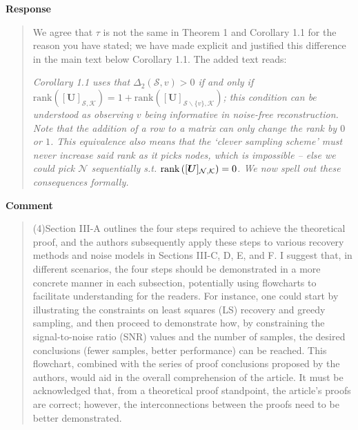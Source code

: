 \documentclass[11pt,onecolumn,journal]{IEEEtran}
\newcommand{\matr}[1]{\bm{#1}}
\theoremstyle{definition}
\newcommand{\set}[1]{\mathcal{#1}}
\newcommand{\rank}[1]{\textrm{rank}\left(#1\right)}
\newcommand{\matrsubU}[1]{\matrsub[#1, K]{U}}
\newcommand{\matrsubUGen}[1]{[\matr{U}]_{#1, \set{K}}}
\begin{document}
\textbf{Response}
\begin{quote}
We agree that $\tau$ is not the same in Theorem 1 and Corollary 1.1 for the reason you have stated; we have made explicit and justified this difference in the main text below Corollary 1.1. The added text reads:


{\it Corollary 1.1 uses that $\Delta_{2}(\set{S},v) > 0$ if and only if $ \rank{\matrsubUGen{\set{S}}} = 1 + \rank{\matrsubUGen{\set{S} \backslash \{v\}}}$; this condition can be understood as observing $v$ being informative in noise-free reconstruction. Note that the addition of a row to a matrix can only change the rank by $0$ or $1$. This equivalence also means that the `clever sampling scheme' must never increase said rank as it picks nodes, which is impossible -- else we could pick $\set{N}$ sequentially s.t. $\rank{\matrsubU{N}} = 0$. We now spell out these consequences formally.}

\end{quote}

\textbf{Comment}
\begin{quote}
(4)Section III-A outlines the four steps required to achieve the theoretical proof, and the authors subsequently apply these steps to various recovery methods and noise models in Sections III-C, D, E, and F. I suggest that, in different scenarios, the four steps should be demonstrated in a more concrete manner in each subsection, potentially using flowcharts to facilitate understanding for the readers. For instance, one could start by illustrating the constraints on least squares (LS) recovery and greedy sampling, and then proceed to demonstrate how, by constraining the signal-to-noise ratio (SNR) values and the number of samples, the desired conclusions (fewer samples, better performance) can be reached. This flowchart, combined with the series of proof conclusions proposed by the authors, would aid in the overall comprehension of the article. It must be acknowledged that, from a theoretical proof standpoint, the article's proofs are correct; however, the interconnections between the proofs need to be better demonstrated.
\end{quote}
\end{document}

